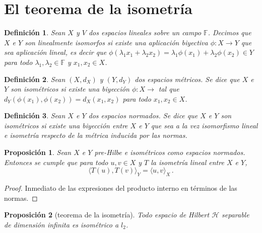 \documentclass[12pt]{book}
\newtheorem{defn}{\bf Definición}[chapter]
\newtheorem{prop}{\bf Proposición}[chapter]
\def\FF{\mathbb{F}}
\newcommand{\lin}[1]{\langle #1 \rangle}
\begin{document}
\section{El teorema  de la isometría}
\begin{defn} Sean $X$ y $V$ dos espacios lineales sobre un campo $\FF$. Decimos que $X$ e $Y$ son {\emph linealmente isomorfos} si existe una aplicación biyectiva $\phi:X\longrightarrow Y$ que sea aplicación lineal, es decir que $\phi(\lambda_1x_1+\lambda_2 x_2)=\lambda_1\phi(x_1)+\lambda_2\phi(x_2)\in Y$ para todo $\lambda_1,\lambda_2\in \FF$ y $x_1,x_2\in X$.
\end{defn}
\begin{defn} Sean $(X,d_X)$ y $(Y,d_Y)$ dos espacios  métricos. Se dice que    $X$ e $Y$  son isométricos si existe una biyección $\phi:X\longrightarrow$ tal que $d_Y(\phi(x_1),\phi(x_2))=d_X(x_1,x_2)$ para todo $x_1,x_2\in X$.
\end{defn}
\begin{defn} Sean $X$ e $Y$ dos espacios normados. Se dice que $X$ e $Y$ son isométricos si existe  una biyección entre $X$ e $Y$ que sea a la vez isomorfismo lineal  e isometría respecto de la métrica inducida por las normas.
\end{defn}
\begin{prop} Sean $X$ e $Y$ pre-Hilbe e isométricos como espacios normados. Entonces se cumple que para todo $u,v\in X$ y $T$  la isometría lineal entre $X$ e $Y$,
$$\lin{T(u),T(v)}_Y=\lin{u,v}_X\,.$$
\end{prop}
\begin{proof} Inmediato de las expresiones del producto interno en términos de las normas.
\end{proof}
\begin{prop}[teorema de la isometría] Todo  espacio de Hilbert $\mathcal{H}$ separable de dimensión infinita es isométrico a $l_2$.
\end{prop}
\end{document}
